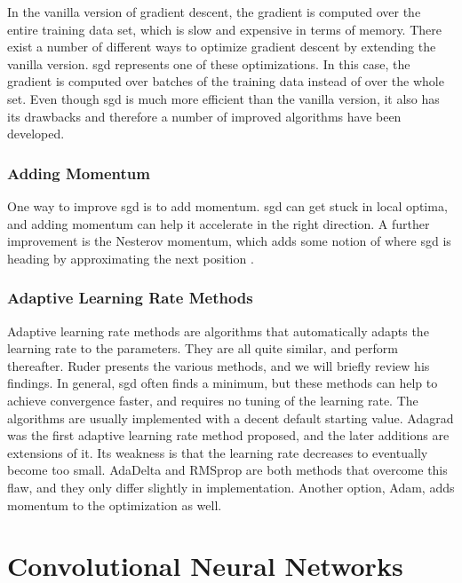 In the vanilla version of gradient descent, the gradient is computed over the entire training data set, which is slow and expensive in terms of memory. There exist a number of different ways to optimize gradient descent by extending the vanilla version. \acrfull{sgd} represents one of these optimizations. In this case, the gradient is computed over batches of the training data instead of over the whole set. Even though \acrshort{sgd} is much more efficient than the vanilla version, it also has its drawbacks and therefore a number of improved algorithms have been developed.

\subsubsection{Adding Momentum}

One way to improve \acrshort{sgd} is to add momentum. \acrshort{sgd} can get stuck in local optima, and adding momentum can help it accelerate in the right direction. A further improvement is the Nesterov momentum, which adds some notion of where \acrshort{sgd} is heading by approximating the next position \cite{optimizers}.

\subsubsection{Adaptive Learning Rate Methods}

Adaptive learning rate methods are algorithms that automatically adapts the learning rate to the parameters. They are all quite similar, and perform thereafter. Ruder \cite{optimizers} presents the various methods, and we will briefly review his findings. In general, \acrshort{sgd} often finds a minimum, but these methods can help to achieve convergence faster, and requires no tuning of the learning rate. The algorithms are usually implemented with a decent default starting value. Adagrad was the first adaptive learning rate method proposed, and the later additions are extensions of it. Its weakness is that the learning rate decreases to eventually become too small. AdaDelta and RMSprop are both methods that overcome this flaw, and they only differ slightly in implementation. Another option, Adam, adds momentum to the optimization as well.

\section{Convolutional Neural Networks} \label{sec:conv-networks}

